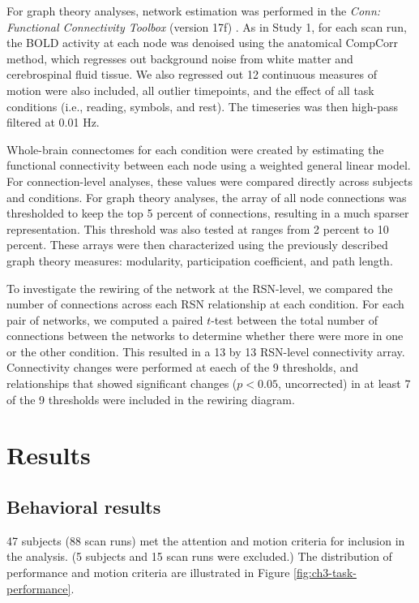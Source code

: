For graph theory analyses, network estimation was performed in the \textit{Conn: Functional Connectivity Toolbox} (version 17f) \citep{WhitfieldGabrieli2012}. As in Study 1, for each scan run, the BOLD activity at each node was denoised using the anatomical CompCorr method, which regresses out background noise from white matter and cerebrospinal fluid tissue. We also regressed out 12 continuous measures of motion were also included, all outlier timepoints, and the effect of all task conditions (i.e., reading, symbols, and rest). The timeseries was then high-pass filtered at 0.01 Hz.

Whole-brain connectomes for each condition were created by estimating the functional connectivity between each node using a weighted general linear model. For connection-level analyses, these values were compared directly across subjects and conditions. For graph theory analyses, the array of all node connections was thresholded to keep the top 5 percent of connections, resulting in a much sparser representation. This threshold was also tested at ranges from 2 percent to 10 percent. These arrays were then characterized using the previously described graph theory measures: modularity, participation coefficient, and path length.

To investigate the rewiring of the network at the RSN-level, we compared the number of connections across each RSN relationship at each condition. For each pair of networks, we computed a paired $t$-test between the total number of connections between the networks to determine whether there were more in one or the other condition. This resulted in a 13 by 13 RSN-level connectivity array. Connectivity changes were performed at eaech of the 9 thresholds, and relationships that showed significant changes ($p < 0.05$, uncorrected) in at least 7 of the 9 thresholds were included in the rewiring diagram.


\section{Results}

\subsection{Behavioral results}

47 subjects (88 scan runs) met the attention and motion criteria for inclusion in the analysis. (5 subjects and 15 scan runs were excluded.) The distribution of performance and motion criteria are illustrated in Figure \ref{fig:ch3-task-performance}. 

